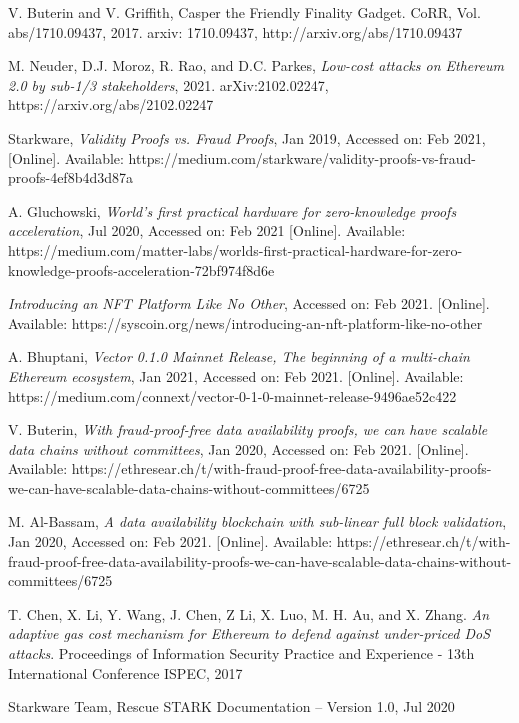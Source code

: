 \documentclass[peerreview]{ieeesyscoin}
\begin{document}
\begin{thebibliography}{00}
 V. Buterin and V. Griffith, Casper the Friendly Finality Gadget. CoRR, Vol. abs/1710.09437, 2017. arxiv: 1710.09437, http://arxiv.org/abs/1710.09437

 M. Neuder, D.J. Moroz, R. Rao, and D.C. Parkes, \textit{Low-cost attacks on Ethereum 2.0 by sub-1/3 stakeholders}, 2021. arXiv:2102.02247,  https://arxiv.org/abs/2102.02247

 Starkware, \textit{Validity Proofs vs. Fraud Proofs}, Jan 2019, Accessed on: Feb 2021, [Online]. Available: https://medium.com/starkware/validity-proofs-vs-fraud-proofs-4ef8b4d3d87a

 A. Gluchowski, \textit{World’s first practical hardware for zero-knowledge proofs acceleration}, Jul 2020, Accessed on: Feb 2021 [Online]. Available:  https://medium.com/matter-labs/worlds-first-practical-hardware-for-zero-knowledge-proofs-acceleration-72bf974f8d6e

  \textit{Introducing an NFT Platform Like No Other}, Accessed on: Feb 2021. [Online]. Available: https://syscoin.org/news/introducing-an-nft-platform-like-no-other

 A. Bhuptani, \textit{Vector 0.1.0 Mainnet Release, The beginning of a multi-chain Ethereum ecosystem}, Jan 2021, Accessed on: Feb 2021.  [Online]. Available:  https://medium.com/connext/vector-0-1-0-mainnet-release-9496ae52c422

  V. Buterin, \textit{With fraud-proof-free data availability proofs, we can have scalable data chains without committees}, Jan 2020, Accessed on: Feb 2021.  [Online]. Available:  https://ethresear.ch/t/with-fraud-proof-free-data-availability-proofs-we-can-have-scalable-data-chains-without-committees/6725

 M. Al-Bassam,\textit{ A data availability blockchain with sub-linear full block validation}, Jan 2020, Accessed on: Feb 2021.  [Online]. Available:  https://ethresear.ch/t/with-fraud-proof-free-data-availability-proofs-we-can-have-scalable-data-chains-without-committees/6725

  T. Chen, X. Li, Y. Wang, J. Chen, Z Li, X. Luo, M. H. Au, and X. Zhang. \textit{An adaptive gas cost mechanism for Ethereum to defend against under-priced DoS attacks}. Proceedings of Information Security Practice and Experience - 13th International Conference ISPEC, 2017

  Starkware Team, Rescue STARK Documentation – Version 1.0, Jul 2020


\end{thebibliography}


\EOD
\end{document}
